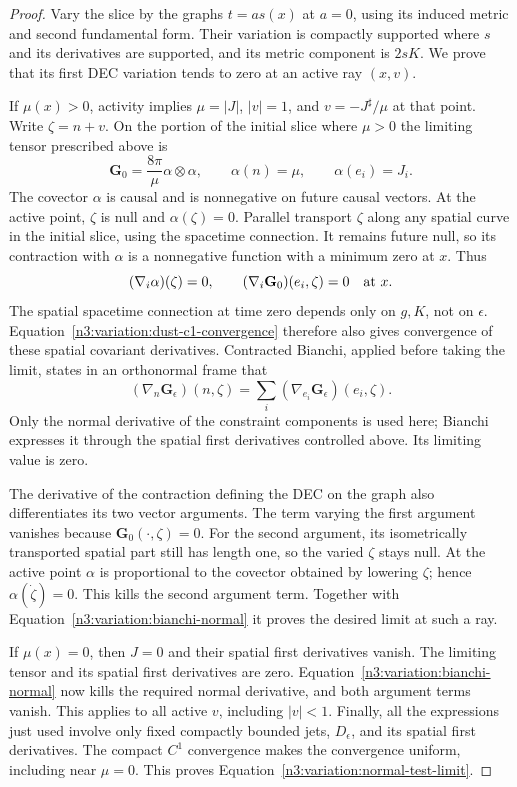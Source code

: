 \begin{proof}
Vary the slice by the graphs $t=a s(x)$ at $a=0$, using its induced
metric and second fundamental form.  Their variation is compactly
supported where $s$ and its derivatives are supported, and its metric
component is $2sK$.  We prove that its first DEC variation tends to
zero at an active ray $(x,v)$.

If $\mu(x)>0$, activity implies
$\mu=|J|$, $|v|=1$, and $v=-J^\sharp/\mu$ at that point.
Write $\zeta=n+v$.  On the portion of the initial slice where
$\mu>0$ the limiting tensor prescribed above is
\begin{equation}
 \mathbf G_0=\frac{8\pi}{\mu}\alpha\otimes\alpha,
 \qquad \alpha(n)=\mu,\qquad \alpha(e_i)=J_i.
 \label{n3:variation:causal-rank-one}
\end{equation}
The covector $\alpha$ is causal and is nonnegative on future causal
vectors.  At the active point, $\zeta$ is null and
$\alpha(\zeta)=0$.  Parallel transport $\zeta$ along any spatial
curve in the initial slice, using the spacetime connection.  It
remains future null, so its contraction with $\alpha$ is a
nonnegative function with a minimum zero at $x$.  Thus
\[
 (\nabla_i\alpha)(\zeta)=0,\qquad
 (\nabla_i\mathbf G_0)(e_i,\zeta)=0
 \quad\hbox{at }x.
\]
The spatial spacetime connection at time zero depends only on $g,K$,
not on $\epsilon$.  Equation~\eqref{n3:variation:dust-c1-convergence}
therefore also gives convergence of these spatial covariant
derivatives.  Contracted Bianchi, applied before taking the limit,
states in an orthonormal frame that
\begin{equation}
 (\nabla_n\mathbf G_\epsilon)(n,\zeta)
   =\sum_i(\nabla_{e_i}\mathbf G_\epsilon)(e_i,\zeta).
 \label{n3:variation:bianchi-normal}
\end{equation}
Only the normal derivative of the constraint components is used here;
Bianchi expresses it through the spatial first derivatives controlled
above.
Its limiting value is zero.

The derivative of the contraction defining the DEC on the graph
also differentiates its two vector arguments.  The term varying
the first argument vanishes because
$\mathbf G_0(\cdot,\zeta)=0$.  For the second argument, its
isometrically transported spatial part still has length one, so the
varied $\zeta$ stays null.  At the active point $\alpha$ is
proportional to the covector obtained by lowering $\zeta$; hence
$\alpha(\dot\zeta)=0$.  This kills the second argument term.
Together with Equation~\eqref{n3:variation:bianchi-normal} it proves
the desired limit at such a ray.

If $\mu(x)=0$, then $J=0$ and their spatial first derivatives vanish.
The limiting tensor and its spatial first derivatives are zero.
Equation~\eqref{n3:variation:bianchi-normal} now kills the required
normal derivative, and both argument terms vanish.  This applies to
all active $v$, including $|v|<1$.  Finally, all the expressions just
used involve only fixed compactly bounded jets, $D_\epsilon$, and
its spatial first derivatives.  The compact $C^1$ convergence makes
the convergence uniform, including near $\mu=0$.
This proves Equation~\eqref{n3:variation:normal-test-limit}.
\end{proof}

